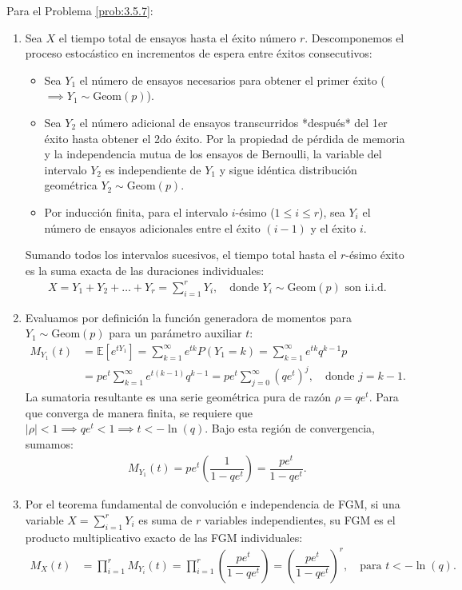 \begin{solucion}
	\label{sol:3.5.7}
	Para el Problema \ref{prob:3.5.7}:
	\begin{enumerate}
		\item Sea $X$ el tiempo total de ensayos hasta el éxito número $r$. Descomponemos el proceso estocástico en incrementos de espera entre éxitos consecutivos:
		\begin{itemize}
			\item Sea $Y_1$ el número de ensayos necesarios para obtener el primer éxito ($\implies Y_1 \sim \text{Geom}(p)$).
			\item Sea $Y_2$ el número adicional de ensayos transcurridos *después* del 1er éxito hasta obtener el 2do éxito. Por la propiedad de pérdida de memoria y la independencia mutua de los ensayos de Bernoulli, la variable del intervalo $Y_2$ es independiente de $Y_1$ y sigue idéntica distribución geométrica $Y_2 \sim \text{Geom}(p)$.
			\item Por inducción finita, para el intervalo $i$-ésimo ($1 \le i \le r$), sea $Y_i$ el número de ensayos adicionales entre el éxito $(i-1)$ y el éxito $i$.
		\end{itemize}
		Sumando todos los intervalos sucesivos, el tiempo total hasta el $r$-ésimo éxito es la suma exacta de las duraciones individuales:
		\begin{align*}
			X = Y_1 + Y_2 + \dots + Y_r = \sum_{i=1}^r Y_i, \quad \text{donde } Y_i \sim \text{Geom}(p) \text{ son i.i.d.}
		\end{align*}
		\item Evaluamos por definición la función generadora de momentos para $Y_1 \sim \text{Geom}(p)$ para un parámetro auxiliar $t$:
		\begin{align*}
			M_{Y_1}(t) &= \mathbb{E}[e^{t Y_1}] = \sum_{k=1}^{\infty} e^{t k} P(Y_1 = k) = \sum_{k=1}^{\infty} e^{t k} q^{k-1} p \\
			&= p e^t \sum_{k=1}^{\infty} e^{t(k-1)} q^{k-1} = p e^t \sum_{j=0}^{\infty} (q e^t)^j, \quad \text{donde } j = k-1.
		\end{align*}
		La sumatoria resultante es una serie geométrica pura de razón $\rho = q e^t$. Para que converga de manera finita, se requiere que $|\rho| < 1 \implies q e^t < 1 \implies t < -\ln(q)$. Bajo esta región de convergencia, sumamos:
		\begin{align*}
			M_{Y_1}(t) = p e^t \left(\dfrac{1}{1 - q e^t}\right) = \dfrac{p e^t}{1 - q e^t}.
		\end{align*}
		\item Por el teorema fundamental de convolución e independencia de FGM, si una variable $X = \sum_{i=1}^r Y_i$ es suma de $r$ variables independientes, su FGM es el producto multiplicativo exacto de las FGM individuales:
		\begin{align*}
			M_X(t) &= \prod_{i=1}^r M_{Y_i}(t) = \prod_{i=1}^r \left(\dfrac{p e^t}{1 - q e^t}\right) = \left(\dfrac{p e^t}{1 - q e^t}\right)^r, \quad \text{para } t < -\ln(q).
		\end{align*}
	\end{enumerate}
\end{solucion}

